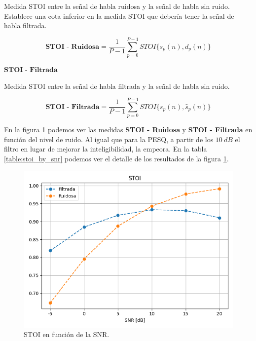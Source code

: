 Medida STOI entre la señal de habla ruidosa y la señal de habla sin ruido. Establece una cota inferior en la medida STOI que debería tener la señal de habla filtrada.

\begin{equation*}
	\textbf{STOI - Ruidosa} = \frac{1}{P-1} \sum_{p=0}^{P-1} STOI\{ s_p(n), d_p(n) \}
\end{equation*}

\noindent $\textbf{STOI - Filtrada}$ 

\vspace{5mm}

Medida STOI entre la señal de habla filtrada y la señal de habla sin ruido. 

\begin{equation*}
	\textbf{STOI - Filtrada} = \frac{1}{P-1} \sum_{p=0}^{P-1} STOI\{ s_p(n), \hat{s}_p(n) \}
\end{equation*}

En la figura \ref{fig:ch6_stoi_by_snr} podemos ver las medidas \textbf{STOI - Ruidosa} y \textbf{STOI - Filtrada} en función del nivel de ruido. Al igual que para la PESQ, a partir de los $\SI{10}{dB}$ el filtro en lugar de mejorar la inteligibilidad, la empeora.  En la tabla \ref{table:stoi_by_snr} podemos ver el detalle de los resultados de la figura \ref{fig:ch6_stoi_by_snr}.

\begin{figure}
	\centering
	\centerline{\includegraphics[scale=0.75]{images/ch6/stoi_by_snr.png}}
	\caption{STOI en función de la SNR.}
	\label{fig:ch6_stoi_by_snr}
\end{figure}

